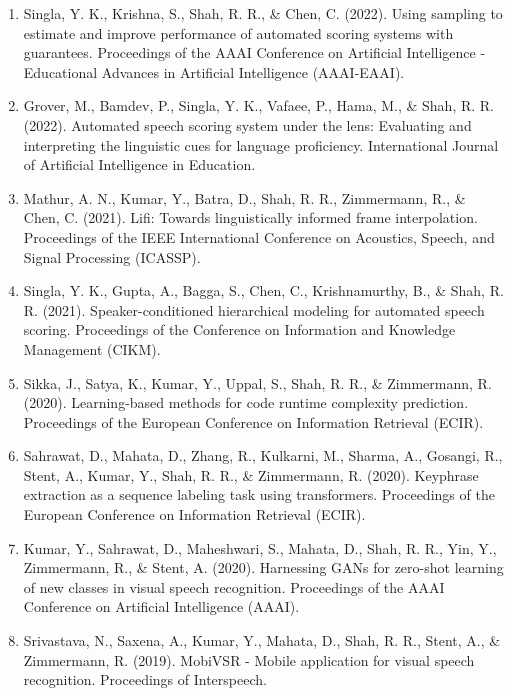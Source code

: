 \begin{enumerate}
    \item Singla, Y. K., Krishna, S., Shah, R. R., \& Chen, C. (2022). Using sampling to estimate and improve performance of automated scoring systems with guarantees. Proceedings of the AAAI Conference on Artificial Intelligence - Educational Advances in Artificial Intelligence (AAAI-EAAI).

    \item Grover, M., Bamdev, P., Singla, Y. K., Vafaee, P., Hama, M., \& Shah, R. R. (2022). Automated speech scoring system under the lens: Evaluating and interpreting the linguistic cues for language proficiency. International Journal of Artificial Intelligence in Education.

    \item Mathur, A. N., Kumar, Y., Batra, D., Shah, R. R., Zimmermann, R., \& Chen, C. (2021). Lifi: Towards linguistically informed frame interpolation. Proceedings of the IEEE International Conference on Acoustics, Speech, and Signal Processing (ICASSP).

    \item Singla, Y. K., Gupta, A., Bagga, S., Chen, C., Krishnamurthy, B., \& Shah, R. R. (2021). Speaker-conditioned hierarchical modeling for automated speech scoring. Proceedings of the Conference on Information and Knowledge Management (CIKM).

    \item Sikka, J., Satya, K., Kumar, Y., Uppal, S., Shah, R. R., \& Zimmermann, R. (2020). Learning-based methods for code runtime complexity prediction. Proceedings of the European Conference on Information Retrieval (ECIR).

    \item Sahrawat, D., Mahata, D., Zhang, R., Kulkarni, M., Sharma, A., Gosangi, R., Stent, A., Kumar, Y., Shah, R. R., \& Zimmermann, R. (2020). Keyphrase extraction as a sequence labeling task using transformers. Proceedings of the European Conference on Information Retrieval (ECIR).

    \item Kumar, Y., Sahrawat, D., Maheshwari, S., Mahata, D., Shah, R. R., Yin, Y., Zimmermann, R., \& Stent, A. (2020). Harnessing GANs for zero-shot learning of new classes in visual speech recognition. Proceedings of the AAAI Conference on Artificial Intelligence (AAAI).

    \item Srivastava, N., Saxena, A., Kumar, Y., Mahata, D., Shah, R. R., Stent, A., \& Zimmermann, R. (2019). MobiVSR - Mobile application for visual speech recognition. Proceedings of Interspeech.


\end{enumerate}
